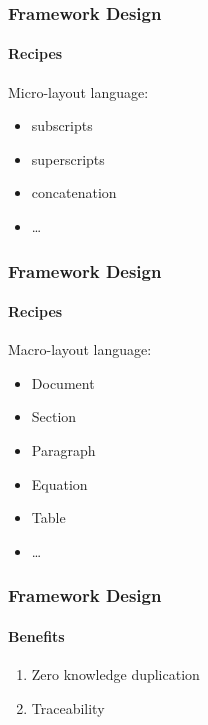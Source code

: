 \documentclass{beamer}
\begin{document}

\begin{frame}

\frametitle{Framework Design}

\framesubtitle{Recipes}


Micro-layout language:
\begin{itemize}
	\item subscripts
	\item superscripts
	\item concatenation
	\item \ldots
\end{itemize}


\end{frame}


\begin{frame}

\frametitle{Framework Design}

\framesubtitle{Recipes}


Macro-layout language:
\begin{itemize}
	\item Document
	\item Section
	\item Paragraph
	\item Equation
	\item Table
	\item \ldots
\end{itemize}



\end{frame}


\begin{frame}

\frametitle{Framework Design}

\framesubtitle{Benefits}


\begin{enumerate}
	\item Zero knowledge duplication
	\item Traceability
\end{enumerate}


\end{frame}
\end{document}
